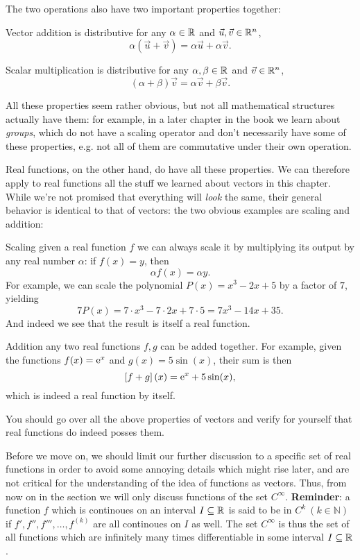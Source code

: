 The two operations also have two important properties together:
\begin{descitemize}
	\item[Vector addition is distributive] for any $\alpha\in\Rs$ and $\vec{u},\vec{v}\in\Rs[n]$,
		\[
			\alpha \left( \vec{u}+\vec{v} \right) = \alpha\vec{u} + \alpha\vec{v}.
		\]
	\item[Scalar multiplication is distributive] for any $\alpha,\beta\in\Rs$ and $\vec{v}\in\Rs[n]$,
		\[
			\left( \alpha+\beta \right) \vec{v} = \alpha\vec{v} + \beta\vec{v}.
		\]
\end{descitemize}

All these properties seem rather obvious, but not all mathematical structures actually have them: for example, in a later chapter in the book we learn about \emph{groups}, which do not have a scaling operator and don't necessarily have some of these properties, e.g. not all of them are commutative under their own operation.

Real functions, on the other hand, do have all these properties. We can therefore apply to real functions all the stuff we learned about vectors in this chapter. While we're not promised that everything will \textit{look} the same, their general behavior is identical to that of vectors: the two obvious examples are scaling and addition:
\begin{descitemize}
	\item[Scaling] given a real function $f$ we can always scale it by multiplying its output by any real number $\alpha$: if $f(x)=y$, then
		\[
			\alpha f(x) = \alpha y.
		\]
		For example, we can scale the polynomial $P(x)=x^{3}-2x+5$ by a factor of $7$, yielding
		\[
			7P(x) = 7\cdot x^{3}-7\cdot2x+7\cdot5 = 7x^{3}-14x+35.
		\]
		And indeed we see that the result is itself a real function.
	\item[Addition] any two real functions $f,g$ can be added together. For example, given the functions $f(x)=\eu^{x}$ and $g(x)=5\sin(x)$, their sum is then
		\[
			\left[ f+g \right](x) = \eu^{x}+5\sin(x),
		\]
		which is indeed a real function by itself.
\end{descitemize}
You should go over all the above properties of vectors and verify for yourself that real functions do indeed posses them.

Before we move on, we should limit our further discussion to a specific set of real functions in order to avoid some annoying details which might rise later, and are not critical for the understanding of the idea of functions as vectors. Thus, from now on in the section we will only discuss functions of the set $C^{\infty}$. \textbf{Reminder}: a function $f$ which is continoues on an interval $I\subseteq\Rs$ is said to be in $C^{k}\ \left(k\in\mathbb{N}\right)$ if $f',f'',f''',\dots,f^{(k)}$ are all continoues on $I$ as well. The set $C^{\infty}$ is thus the set of all functions which are infinitely many times differentiable in some interval $I\subseteq\Rs$.

